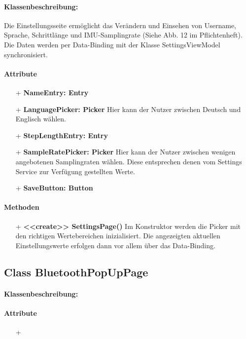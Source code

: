 \documentclass[a4paper,12pt]{article}
\begin{document}
		\paragraph{Klassenbeschreibung:}
		Die Einstellungsseite ermöglicht das Verändern und Einsehen von Username, Sprache, Schrittlänge und IMU-Samplingrate (Siehe Abb. 12 im Pflichtenheft). Die Daten werden per Data-Binding mit der Klasse SettingsViewModel synchronisiert.
		\paragraph{Attribute}
		\begin{itemize}
			\item [+]\textbf{NameEntry: Entry}
			\item [+]\textbf{LanguagePicker: Picker} Hier kann der Nutzer zwischen Deutsch und Englisch wählen.
			\item [+]\textbf{StepLengthEntry: Entry} 
			\item [+]\textbf{SampleRatePicker: Picker} Hier kann der Nutzer zwischen wenigen angebotenen Samplingraten wählen. Diese entsprechen denen vom Settings Service zur Verfügung gestellten Werte.
			\item [+]\textbf{SaveButton: Button}
		\end{itemize}
		\paragraph{Methoden}
		\begin{itemize}
			\item [+]\textbf{<<create>> SettingsPage()} Im Konstruktor werden die Picker mit den richtigen Wertebereichen inizialisiert. Die angezeigten aktuellen Einstellungswerte erfolgen dann vor allem über das Data-Binding.
		\end{itemize}
	\subsection{Class BluetoothPopUpPage}
		\paragraph{Klassenbeschreibung:}
		\paragraph{Attribute}
		\begin{itemize}
			\item [+]
		\end{itemize}
\end{document}
